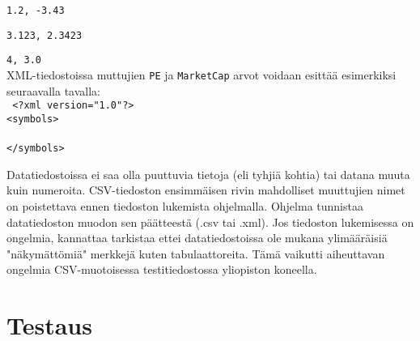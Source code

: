 \documentclass{article}
\begin{document}
    \texttt{1.2, -3.43}
    
    \texttt{3.123, 2.3423}
    
    \texttt{4, 3.0} \\
    
    XML-tiedostoissa muttujien \texttt{PE} ja \texttt{MarketCap} arvot voidaan esittää esimerkiksi seuraavalla tavalla: \\
    
    \texttt{
    <?xml version="1.0"?> \\
    <symbols> \\
\\
    </symbols>\\
    }
    
    Datatiedostoissa ei saa olla puuttuvia tietoja (eli tyhjiä kohtia) tai datana muuta kuin numeroita. 
	CSV-tiedoston ensimmäisen rivin mahdolliset muuttujien nimet on poistettava ennen tiedoston lukemista 
	ohjelmalla. Ohjelma tunnistaa datatiedoston muodon sen päätteestä (.csv tai .xml). Jos tiedoston 
	lukemisessa on ongelmia, kannattaa tarkistaa ettei datatiedostoissa ole mukana ylimääräisiä "näkymättömiä"
	merkkejä kuten tabulaattoreita. Tämä vaikutti aiheuttavan ongelmia CSV-muotoisessa testitiedostossa
	yliopiston koneella.
    
\section{Testaus}
\end{document}
